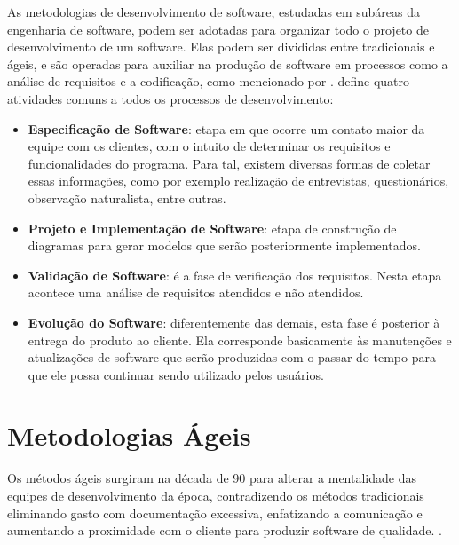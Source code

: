 As metodologias de desenvolvimento de software, estudadas em subáreas da engenharia de software, podem ser adotadas para organizar todo o projeto de desenvolvimento de um software. Elas podem ser divididas entre tradicionais e ágeis, e são operadas para auxiliar na produção de software em processos como a análise de requisitos e a codificação, como mencionado por .  define quatro atividades comuns a todos os processos de desenvolvimento:

\begin{itemize}
 \item \textbf{Especificação de Software}: etapa em que ocorre um contato maior da equipe com os clientes, com o intuito de determinar os requisitos e funcionalidades do programa. Para tal, existem diversas formas de coletar essas informações, como por exemplo realização de entrevistas, questionários, observação naturalista, entre outras.
 \item \textbf{Projeto e Implementação de Software}: etapa de construção de diagramas para gerar modelos que serão posteriormente implementados.
 \item \textbf{Validação de Software}: é a fase de verificação dos requisitos. Nesta etapa acontece uma análise de requisitos atendidos e não atendidos.
 \item \textbf{Evolução do Software}: diferentemente das demais, esta fase é posterior à entrega do produto ao cliente. Ela corresponde basicamente às manutenções e atualizações de software que serão produzidas com o passar do tempo para que ele possa continuar sendo utilizado pelos usuários.
\end{itemize}

\hspace{2.5cm}

\section{Metodologias Ágeis}
\label{sec:metodologiaagil}
\hspace{2.5cm}

Os métodos ágeis surgiram na década de 90 para alterar a mentalidade das equipes de desenvolvimento da época, contradizendo os métodos tradicionais eliminando gasto com documentação excessiva, enfatizando a comunicação e aumentando a proximidade com o cliente para produzir software de qualidade. .


